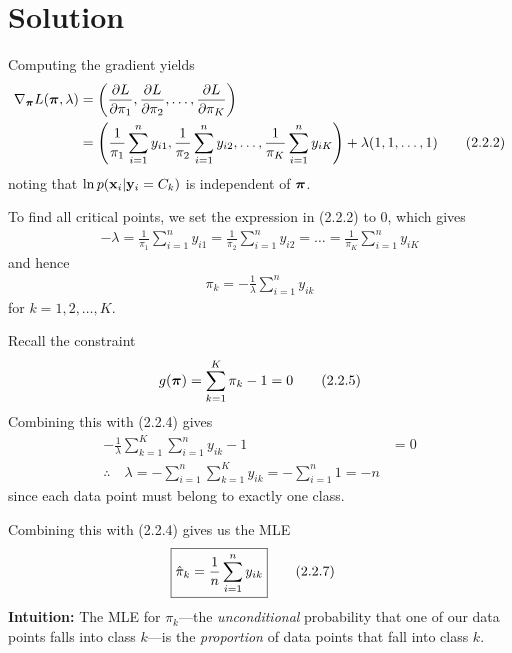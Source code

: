 \documentclass[submit]{../harvardml}
\newenvironment{solution}
  {\color{blue}\section*{Solution}}
{}
\begin{document}
\begin{solution}
\begin{enumerate}
    \vspace{.5em}
    Computing the gradient yields
    \begin{align*}
        \nabla_{\boldsymbol{\pi}} L(\boldsymbol{\pi}, \lambda) &= \left( \frac{\partial L}{\partial \pi_1}, \frac{\partial L}{\partial \pi_2}, \ldots, \frac{\partial L}{\partial \pi_K} \right) \\
        &= \left( \frac{1}{\pi_1}\sum_{i=1}^ny_{i1}, \frac{1}{\pi_2}\sum_{i=1}^ny_{i2}, \ldots, \frac{1}{\pi_K}\sum_{i=1}^ny_{iK} \right) + \lambda(1,1,\ldots,1) \tag*{(2.2.2)}
    \end{align*}
    noting that $\ln p(\mathbf{x}_i | \mathbf{y}_i = C_k)$ is independent of $\boldsymbol{\pi}$.

    \clearpage
    To find all critical points, we set the expression in (2.2.2) to 0, which gives
    \begin{align*}
        -\lambda = \frac{1}{\pi_1}\sum_{i=1}^ny_{i1} = \frac{1}{\pi_2}\sum_{i=1}^ny_{i2} = \ldots = \frac{1}{\pi_K}\sum_{i=1}^ny_{iK} \tag*{(2.2.3)}
    \end{align*}
    and hence
    \begin{align*}
        \pi_k = -\frac{1}{\lambda} \sum_{i=1}^n y_{ik} \tag*{(2.2.4)}
    \end{align*}
    for $k = 1,2,\ldots,K$.

    \vspace{.5em}
    Recall the constraint
    \begin{align*}
        g(\boldsymbol{\pi}) = \sum_{k=1}^K \pi_k - 1 = 0 \tag*{(2.2.5)}
    \end{align*}
    Combining this with (2.2.4) gives
    \begin{align*}
        -\frac{1}{\lambda} \sum_{k=1}^K \sum_{i=1}^n y_{ik} - 1 &= 0 \\
        \therefore \quad \lambda = -\sum_{i=1}^n \sum_{k=1}^K y_{ik} = -\sum_{i=1}^n 1 = -n \tag*{(2.2.6)}
    \end{align*}
    since each data point must belong to exactly one class.

    \vspace{.5em}
    Combining this with (2.2.4) gives us the MLE
    \begin{align*}
        \Aboxed{ \hat{\pi}_k &= \frac{1}{n}\sum_{i=1}^n y_{ik} } \tag*{(2.2.7)}
    \end{align*}
    \textbf{Intuition:} The MLE for $\pi_k$---the \textit{unconditional} probability that one of our data points falls into class $k$---is the \textit{proportion} of data points that fall into class $k$. 


\end{enumerate}
\end{solution}
\end{document}
